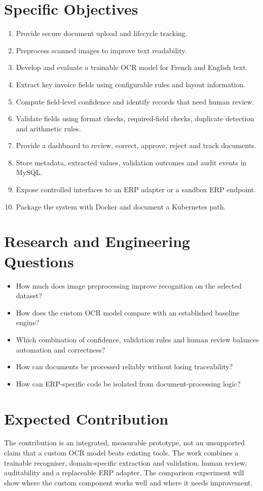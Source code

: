 \section{Specific Objectives}
\begin{enumerate}
\item Provide secure document upload and lifecycle tracking.
\item Preprocess scanned images to improve text readability.
\item Develop and evaluate a trainable OCR model for French and English text.
\item Extract key invoice fields using configurable rules and layout information.
\item Compute field-level confidence and identify records that need human review.
\item Validate fields using format checks, required-field checks, duplicate detection and arithmetic rules.
\item Provide a dashboard to review, correct, approve, reject and track documents.
\item Store metadata, extracted values, validation outcomes and audit events in MySQL.
\item Expose controlled interfaces to an ERP adapter or a sandbox ERP endpoint.
\item Package the system with Docker and document a Kubernetes path.
\end{enumerate}

\section{Research and Engineering Questions}
\begin{itemize}
\item How much does image preprocessing improve recognition on the selected dataset?
\item How does the custom OCR model compare with an established baseline engine?
\item Which combination of confidence, validation rules and human review balances automation and correctness?
\item How can documents be processed reliably without losing traceability?
\item How can ERP-specific code be isolated from document-processing logic?
\end{itemize}

\section{Expected Contribution}
The contribution is an integrated, measurable prototype, not an unsupported claim that a custom OCR model beats existing tools. The work combines a trainable recogniser, domain-specific extraction and validation, human review, auditability and a replaceable ERP adapter. The comparison experiment will show where the custom component works well and where it needs improvement.

